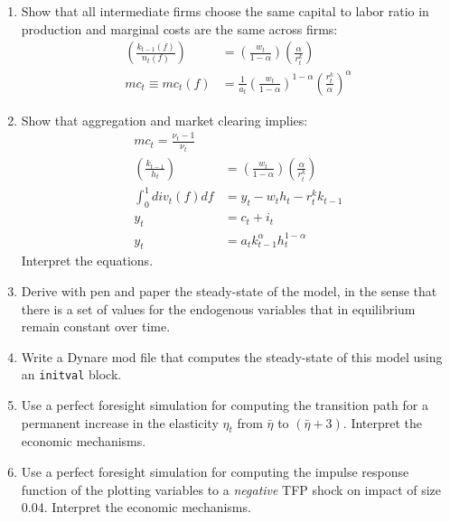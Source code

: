\documentclass{article}
\begin{document}
\begin{enumerate}
\item Show that all intermediate firms choose the same capital to labor ratio in production and marginal costs are the same across firms:
\begin{align}
\left(\frac{k_{t-1}(f)}{n_t(f)}\right) &= \left(\frac{w_t}{1-\alpha}\right) \left(\frac{\alpha}{r^k_t}\right) \label{eq:RBCMonopIrrInv.IntermediateFirms.CapitalLaborRatio}
\\
mc_t \equiv mc_t(f) &= \frac{1}{a_t} \left(\frac{w_t}{1-\alpha}\right)^{1-\alpha} \left(\frac{r^k_t}{\alpha}\right)^{\alpha} \label{eq:RBCMonopIrrInv.RealMarginalCosts}
\end{align}


\item Show that aggregation and market clearing implies:
\begin{align}
mc_t = \frac{\nu_t-1}{\nu_t} \label{eq:RBCMonopIrrInv.MarginalCostsAggregated}
\\
\left(\frac{k_{t-1}}{h_t}\right) &= \left(\frac{w_t}{1-\alpha}\right) \left(\frac{\alpha}{r^k_t}\right) \label{eq:RBCMonopIrrInv.IntermediateFirms.CapitalLaborRatioAggregated}
\\
\int_{0}^{1} div_t(f) df &= y_t - w_t h_t - r^k_t k_{t-1}\label{eq:RBCMonopIrrInv.IntermediateFirms.AggregateProfits}
\\
y_t &= c_t + i_t \label{eq:RBCMonopIrrInv.AggregateDemand}
\\
y_t &= a_t k_{t-1}^\alpha h_t^{1-\alpha} \label{eq:RBCMonopIrrInv.AggregateSupply}
\end{align}
Interpret the equations.

\item Derive with pen and paper the steady-state of the model, in the sense that there is a set of values for the endogenous variables that in equilibrium remain constant over time.

\item Write a Dynare mod file that computes the steady-state of this model using an \texttt{initval} block.

\item Use a perfect foresight simulation for computing the transition path for a permanent increase in the elasticity $\eta_t$ from $\bar{\eta}$ to $(\bar{\eta}+3)$.
Interpret the economic mechanisms.

\item Use a perfect foresight simulation for computing the impulse response function of the plotting variables to a \emph{negative} TFP shock on impact of size 0.04.
Interpret the economic mechanisms.

\end{enumerate}
\end{document}

